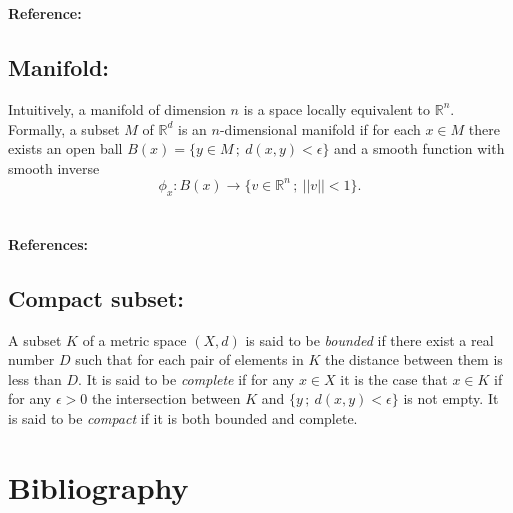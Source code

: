 \documentclass{amsart}
\begin{document}
	\paragraph{\\ Reference:} \cite{takens1981detecting}
	
	\subsection*{Manifold:} \label{manifold}
	
	Intuitively, a manifold of dimension $n$ is a space locally equivalent to $\mathbb R^n$. Formally, a subset $M$ of $\mathbb R^d$ is an $n$-dimensional manifold if for each $x \in M$ there exists an open ball $B(x) = \{ y \in M\,;\ d(x,y) < \epsilon\}$ and a smooth function with smooth inverse 
	\begin{equation*}
	\phi_x : B(x) \to \{v \in \mathbb R^n\,;\ ||v||<1\}.
	\end{equation*}
	
	\paragraph{\\ References:} \cite{milnor1997topology,guillemin2010differential}
	
	\subsection*{Compact subset:}	\label{compact subset}

	A subset $K$ of a metric space $(X,d)$ is said to be \textit{bounded} if there exist a real number $D$ such that for each pair of elements in $K$ the distance between them is less than $D$. It is said to be \textit{complete} if for any $x \in X$ it is the case that $x \in K$ if for any $\epsilon > 0$ the intersection between $K$ and $\{y \,;\ d(x,y) < \epsilon \}$ is not empty. It is said to be \textit{compact} if it is both bounded and complete.

	\section{Bibliography}
	{}
	
\end{document}
